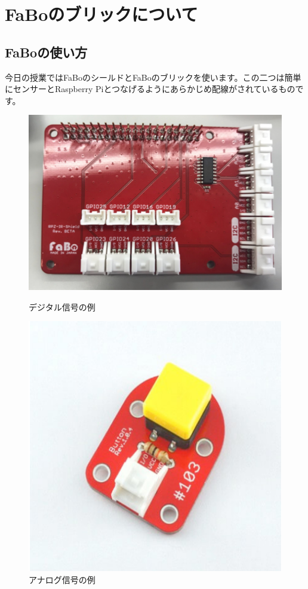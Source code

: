 \section{FaBoのブリックについて}
\subsection{FaBoの使い方}
今日の授業ではFaBoのシールドとFaBoのブリックを使います。この二つは簡単にセンサーとRaspberry Piとつなげるようにあらかじめ配線がされているものです。

\begin{figure}[htbp]
  \begin{minipage}[b]{0.45\linewidth}
    \centering
    \includegraphics[keepaspectratio, scale=0.6]{images/chap05/text05-img004.png}
    \caption{デジタル信号の例}
    \label{fig4}
  \end{minipage}
  \begin{minipage}[b]{0.45\linewidth}
    \centering
    \includegraphics[keepaspectratio, scale=0.6]{images/chap05/text05-img005.png}
    \caption{アナログ信号の例}
    \label{fig5}
  \end{minipage}
\end{figure}

